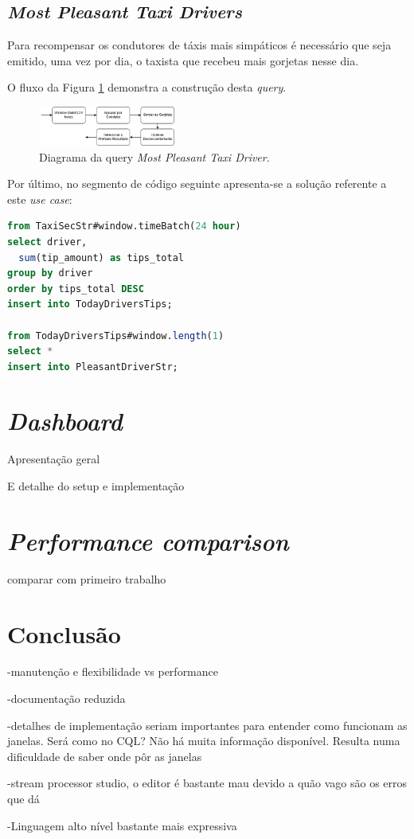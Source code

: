 \documentclass[article]{IEEEtran}
\begin{document}
\subsection{\textit{Most Pleasant Taxi Drivers}}

Para recompensar os condutores de táxis mais simpáticos é necessário que seja emitido, uma vez por dia, o taxista que recebeu mais gorjetas nesse dia.

O fluxo da Figura \ref{fig:pleasantDriverDiagram} demonstra a construção desta \textit{query}.

\begin{figure}[hbtp]
    \centering
    \includegraphics[width=0.4\textwidth]{images/pleasantDriver}
    \caption{Diagrama da query \textit{Most Pleasant Taxi Driver}.}
    \label{fig:pleasantDriverDiagram}
\end{figure}



Por último, no segmento de código seguinte apresenta-se a solução referente a este \textit{use case}:

\begin{lstlisting}[language=SQL]
from TaxiSecStr#window.timeBatch(24 hour)
select driver, 
  sum(tip_amount) as tips_total
group by driver
order by tips_total DESC
insert into TodayDriversTips;

from TodayDriversTips#window.length(1)
select *
insert into PleasantDriverStr;
\end{lstlisting}

\section{\textit{Dashboard}} 
		Apresentação geral
		
		E detalhe do setup e implementação 
		
\section{\textit{Performance comparison}} 
comparar com primeiro trabalho
		
\section{Conclusão} 
-manutenção e flexibilidade vs performance

-documentação reduzida

-detalhes de implementação seriam importantes para entender como funcionam as janelas. Será como no CQL? Não há muita informação disponível. Resulta numa dificuldade de saber onde pôr as janelas

-stream processor studio, o editor é bastante mau devido a quão vago são os erros que dá

-Linguagem alto nível bastante mais expressiva







\end{document}
